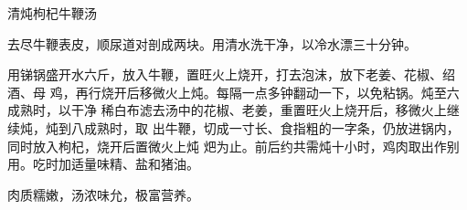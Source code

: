 \begin{recipe}{清炖枸杞牛鞭汤}

\ingredients



\preparation

去尽牛鞭表皮，顺尿道对剖成两块。用清水洗干净，以冷水漂三十分钟。

用锑锅盛开水六斤，放入牛鞭，置旺火上烧开，打去泡沫，放下老姜、花椒、绍酒、母
鸡，再行烧开后移微火上炖。每隔一点多钟翻动一下，以免粘锅。炖至六成熟时，以干净
稀白布滤去汤中的花椒、老姜，重置旺火上烧开后，移微火上继续炖，炖到八成熟时，取
出牛鞭，切成一寸长、食指粗的一字条，仍放进锅内，同时放入枸杞，烧开后置微火上炖
𤆵为止。前后约共需炖十小时，鸡肉取出作别用。吃时加适量味精、盐和猪油。

\features

肉质糯嫩，汤浓味允，极富营养。

\end{recipe}

